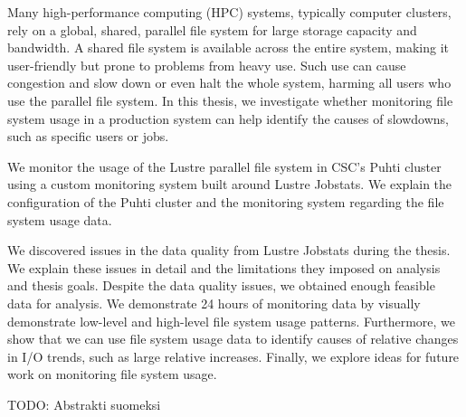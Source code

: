\makecoverpage
\makecopyrightpage

\begin{abstractpage}[english]
Many high-performance computing (HPC) systems, typically computer clusters, rely on a global, shared, parallel file system for large storage capacity and bandwidth.
A shared file system is available across the entire system, making it user-friendly but prone to problems from heavy use.
Such use can cause congestion and slow down or even halt the whole system, harming all users who use the parallel file system.
In this thesis, we investigate whether monitoring file system usage in a production system can help identify the causes of slowdowns, such as specific users or jobs.


We monitor the usage of the Lustre parallel file system in CSC's Puhti cluster using a custom monitoring system built around Lustre Jobstats.
We explain the configuration of the Puhti cluster and the monitoring system regarding the file system usage data.

We discovered issues in the data quality from Lustre Jobstats during the thesis.
We explain these issues in detail and the limitations they imposed on analysis and thesis goals.
Despite the data quality issues, we obtained enough feasible data for analysis.
We demonstrate 24 hours of monitoring data by visually demonstrate low-level and high-level file system usage patterns.
Furthermore, we show that we can use file system usage data to identify causes of relative changes in I/O trends, such as large relative increases.
Finally, we explore ideas for future work on monitoring file system usage.
\end{abstractpage}



\begin{abstractpage}[finnish]
TODO: Abstrakti suomeksi
\end{abstractpage}


